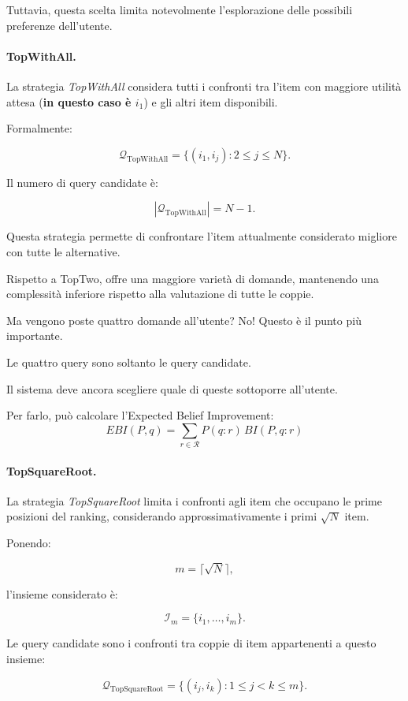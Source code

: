 Tuttavia, questa scelta limita notevolmente l'esplorazione delle possibili preferenze dell'utente.

\paragraph{TopWithAll.}

La strategia \textit{TopWithAll} considera tutti i confronti tra l'item con maggiore utilità attesa (\textbf{in questo caso è $i_1$}) e gli altri item disponibili.

Formalmente:

\[
\mathcal{Q}_{\mathrm{TopWithAll}}
=
\{(i_1,i_j):2\leq j\leq N\}.
\]

Il numero di query candidate è:

\[
|\mathcal{Q}_{\mathrm{TopWithAll}}|=N-1.
\]

Questa strategia permette di confrontare l'item attualmente considerato migliore con tutte le alternative.

Rispetto a TopTwo, offre una maggiore varietà di domande, mantenendo una complessità inferiore rispetto alla valutazione di tutte le coppie.

Ma vengono poste quattro domande all'utente?
No! Questo è il punto più importante.

Le quattro query sono soltanto le query candidate.

Il sistema deve ancora scegliere quale di queste sottoporre all'utente.

Per farlo, può calcolare l'Expected Belief Improvement:
\[
EBI(P,q)=
\sum_{r\in\mathcal R}P(q:r)\,BI(P,q:r)
\]

\paragraph{TopSquareRoot.}

La strategia \textit{TopSquareRoot} limita i confronti agli item che occupano le prime posizioni del ranking, considerando approssimativamente i primi $\sqrt{N}$ item.

Ponendo:

\[
m=\lceil\sqrt{N}\rceil,
\]

l'insieme considerato è:

\[
\mathcal{I}_{m}
=
\{i_1,\ldots,i_m\}.
\]

Le query candidate sono i confronti tra coppie di item appartenenti a questo insieme:

\[
\mathcal{Q}_{\mathrm{TopSquareRoot}}
=
\{(i_j,i_k):1\leq j<k\leq m\}.
\]

